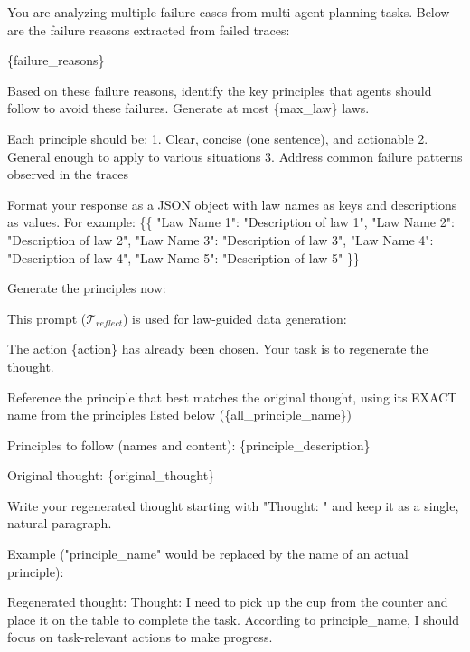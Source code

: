 \documentclass{article}
\theoremstyle{plain}
\theoremstyle{definition}
\theoremstyle{remark}
\begin{document}
\begin{mdframed}[linewidth=0.8pt, roundcorner=4pt, innerleftmargin=6pt, innerrightmargin=6pt]
You are analyzing multiple failure cases from multi-agent planning tasks. Below are the failure reasons extracted from failed traces:

\{failure\_reasons\}

Based on these failure reasons, identify the key principles that agents should follow to avoid these failures. Generate at most \{max\_law\} laws.

Each principle should be:
1. Clear, concise (one sentence), and actionable
2. General enough to apply to various situations
3. Address common failure patterns observed in the traces

Format your response as a JSON object with law names as keys and descriptions as values. For example:
\{\{
    "Law Name 1": "Description of law 1",
    "Law Name 2": "Description of law 2",
    "Law Name 3": "Description of law 3",
    "Law Name 4": "Description of law 4",
    "Law Name 5": "Description of law 5"
\}\}

Generate the principles now:

\end{mdframed}

This prompt ($\mathcal{T}_{reflect}$) is used for law-guided data generation:

\begin{mdframed}[linewidth=0.8pt, roundcorner=4pt, innerleftmargin=6pt, innerrightmargin=6pt]
The action \{action\} has already been chosen. Your task is to regenerate the thought.

Reference the principle that best matches the original thought, using its EXACT name from the principles listed below (\{all\_principle\_name\})

Principles to follow (names and content):
\{principle\_description\}

Original thought:
\{original\_thought\}

Write your regenerated thought starting with "Thought: " and keep it as a single, natural paragraph.

Example ("principle\_name" would be replaced by the name of an actual principle):

Regenerated thought: Thought: I need to pick up the cup from the counter and place it on the table to complete the task. According to principle\_name, I should focus on task-relevant actions to make progress.
\end{mdframed}
\end{document}
